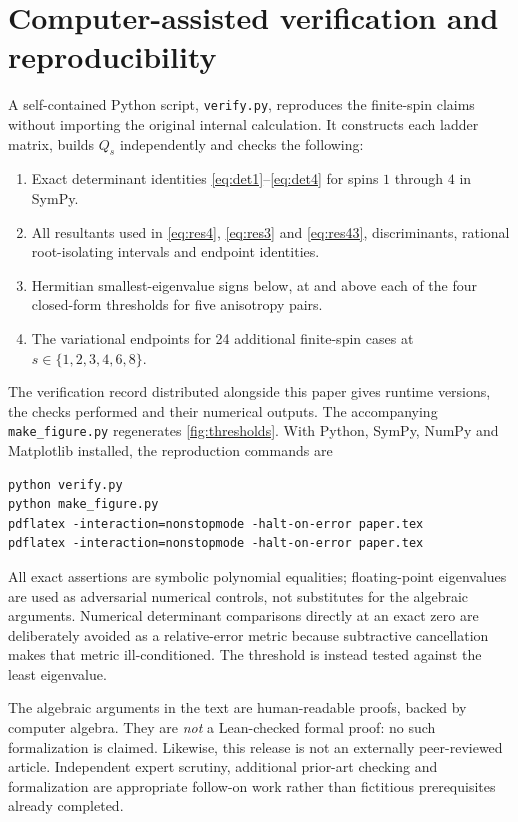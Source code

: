 \documentclass[11pt,a4paper]{article}
\begin{document}
\section{Computer-assisted verification and reproducibility}\label{sec:repro}
A self-contained Python script, \texttt{verify.py}, reproduces the
finite-spin claims without importing the original internal
calculation. It constructs each ladder matrix, builds
$Q_s$ independently and checks the following:
\begin{enumerate}[leftmargin=*,itemsep=.2em]
\item Exact determinant identities \eqref{eq:det1}--\eqref{eq:det4}
 for spins $1$ through $4$ in SymPy.
\item All resultants used in \eqref{eq:res4},
 \eqref{eq:res3} and \eqref{eq:res43}, discriminants,
 rational root-isolating intervals and endpoint identities.
\item Hermitian smallest-eigenvalue signs below, at and above
 each of the four closed-form thresholds for five anisotropy pairs.
\item The variational endpoints for 24 additional finite-spin
 cases at $s\in\{1,2,3,4,6,8\}$.
\end{enumerate}
The verification record distributed alongside this paper gives
runtime versions, the checks performed and their numerical outputs.
The accompanying \texttt{make\_figure.py} regenerates
\cref{fig:thresholds}. With Python, SymPy, NumPy and Matplotlib
installed, the reproduction commands are
\begin{verbatim}
python verify.py
python make_figure.py
pdflatex -interaction=nonstopmode -halt-on-error paper.tex
pdflatex -interaction=nonstopmode -halt-on-error paper.tex
\end{verbatim}
All exact assertions are symbolic polynomial equalities;
floating-point eigenvalues are used as adversarial numerical
controls, not substitutes for the algebraic arguments.
Numerical determinant comparisons directly at an exact zero
are deliberately avoided as a relative-error metric because
subtractive cancellation makes that metric ill-conditioned.
The threshold is instead tested against the least eigenvalue.

The algebraic arguments in the text are human-readable proofs,
backed by computer algebra. They are \emph{not} a Lean-checked
formal proof: no such formalization is claimed. Likewise, this
release is not an externally peer-reviewed article. Independent
expert scrutiny, additional prior-art checking and formalization
are appropriate follow-on work rather than fictitious prerequisites
already completed.
\end{document}
